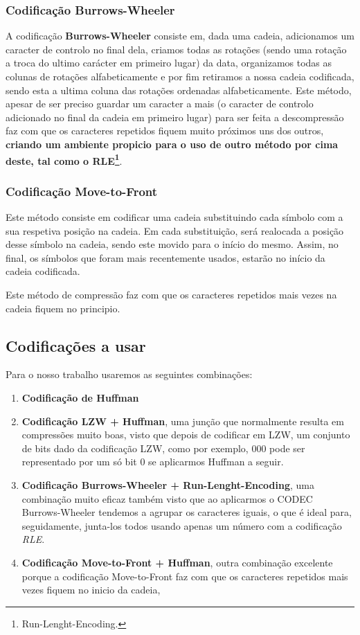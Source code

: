 \documentclass[11pt,journal,compsoc]{IEEEtran}
\begin{document}
\subsubsection{Codificação \textbf{Burrows-Wheeler}}
A codificação \textbf{Burrows-Wheeler} consiste em, dada uma cadeia, adicionamos um caracter de controlo no final dela, criamos todas as rotações (sendo uma rotação a troca do ultimo carácter em primeiro lugar) da data, organizamos todas as colunas de rotações alfabeticamente e por fim retiramos a nossa cadeia codificada, sendo esta a ultima coluna das rotações ordenadas alfabeticamente.
Este método, apesar de ser preciso guardar um caracter a mais (o caracter de controlo adicionado no final da cadeia em primeiro lugar) para ser feita a descompressão faz com que os caracteres repetidos fiquem muito próximos uns dos outros, \textbf{criando um ambiente propicio para o uso de outro método por cima deste, tal como o  RLE\footnote{Run-Lenght-Encoding.}}.



\subsubsection{Codificação Move-to-Front}
Este método consiste em codificar uma cadeia substituindo cada símbolo com a sua respetiva posição na cadeia. Em cada substituição, será realocada a posição desse símbolo na cadeia, sendo este movido para o início do mesmo. Assim, no final, os símbolos que foram mais recentemente usados, estarão no início da cadeia codificada.

Este método de compressão faz com que os caracteres repetidos mais vezes na cadeia fiquem no principio.


\subsection{Codificações a usar}
Para o nosso trabalho usaremos as seguintes combinações:
\begin{enumerate}
    \item \textbf{Codificação de Huffman}
    \item \textbf{Codificação LZW + Huffman}, uma junção que normalmente resulta em compressões muito boas, visto que depois de codificar em LZW, um conjunto de bits dado da codificação LZW, como por exemplo, 000 pode ser representado por um só bit 0 se aplicarmos Huffman a seguir.
    \item \textbf{Codificação Burrows-Wheeler + Run-Lenght-Encoding}, uma combinação muito eficaz também visto que ao aplicarmos o CODEC Burrows-Wheeler tendemos a agrupar os caracteres iguais, o que é ideal para, seguidamente, junta-los todos usando apenas um número com a codificação \textit{RLE}.
    
    \item \textbf{Codificação Move-to-Front + Huffman}, outra combinação excelente porque a codificação Move-to-Front faz com que os caracteres repetidos mais vezes fiquem no inicio da cadeia, %
\end{enumerate}
\end{document}

